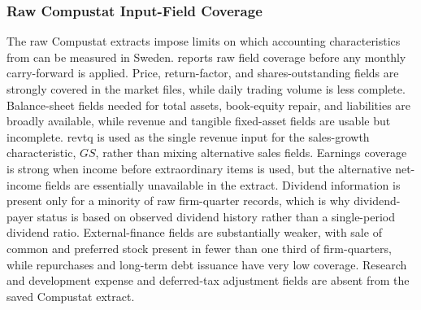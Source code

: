 \documentclass[11pt]{article}
\newcommand{\var}[1]{\ensuremath{#1}}
\newcommand{\repo}[1]{\textnormal{\small #1}}
\begin{document}
\subsubsection{Raw Compustat Input-Field Coverage}

The raw Compustat extracts impose limits on which accounting characteristics from \citet{baker2006sentiment} can be measured in Sweden.  reports raw field coverage before any monthly carry-forward is applied. Price, return-factor, and shares-outstanding fields are strongly covered in the market files, while daily trading volume is less complete. Balance-sheet fields needed for total assets, book-equity repair, and liabilities are broadly available, while revenue and tangible fixed-asset fields are usable but incomplete. \repo{revtq} is used as the single revenue input for the sales-growth characteristic, \var{GS}, rather than mixing alternative sales fields. Earnings coverage is strong when income before extraordinary items is used, but the alternative net-income fields are essentially unavailable in the extract. Dividend information is present only for a minority of raw firm-quarter records, which is why dividend-payer status is based on observed dividend history rather than a single-period dividend ratio. External-finance fields are substantially weaker, with sale of common and preferred stock present in fewer than one third of firm-quarters, while repurchases and long-term debt issuance have very low coverage. Research and development expense and deferred-tax adjustment fields are absent from the saved Compustat extract.
\end{document}
